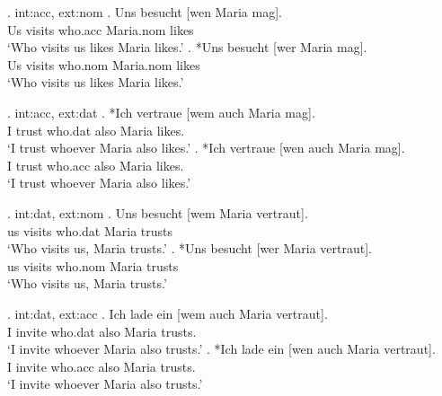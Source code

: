 \ex. \ac{int}:\ac{acc}, \ac{ext}:\ac{nom}
\ag. Uns besucht [wen Maria mag].\\
 Us visits\scsub{[nom]} who.\ac{acc} Maria.\ac{nom} likes\scsub{[acc]}\\
 `Who visits us likes Maria likes.' 
\bg. *Uns besucht [wer Maria mag].\\
 Us visits\scsub{[nom]} who.\ac{nom} Maria.\ac{nom} likes\scsub{[acc]}\\
 `Who visits us likes Maria likes.' 

 \ex. \ac{int}:\ac{acc}, \ac{ext}:\ac{dat}
\ag. *Ich vertraue [wem auch Maria mag]. \\
 I trust\scsub{[dat]} who.\ac{dat} also Maria likes\scsub{[acc]}.\\
 `I trust whoever Maria also likes.' 
\bg. *Ich vertraue [wen auch Maria mag]. \\
 I trust\scsub{[dat]} who.\ac{acc} also Maria likes\scsub{[acc]}.\\
 `I trust whoever Maria also likes.' 

\ex. \ac{int}:\ac{dat}, \ac{ext}:\ac{nom}
\ag. Uns besucht [wem Maria vertraut].\\
 us visits\scsub{[nom]} who.\ac{dat} Maria trusts\scsub{[dat]}\\
 `Who visits us, Maria trusts.' 
\bg. *Uns besucht [wer Maria vertraut].\\
 us visits\scsub{[nom]} who.\ac{nom} Maria trusts\scsub{[dat]}\\
 `Who visits us, Maria trusts.' 

\ex. \ac{int}:\ac{dat}, \ac{ext}:\ac{acc}
\ag. Ich {lade ein} [wem auch Maria vertraut]. \\
 I invite\scsub{[acc]} who.\ac{dat} also Maria trusts\scsub{[dat]}.\\
 `I invite whoever Maria also trusts.' 
\bg. *Ich {lade ein} [wen auch Maria vertraut]. \\
 I invite\scsub{[acc]} who.\ac{acc} also Maria trusts\scsub{[dat]}.\\
 `I invite whoever Maria also trusts.' 


